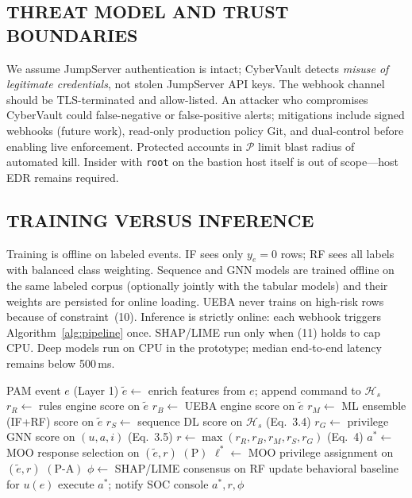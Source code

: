 \documentclass{ieeeaccess}
\begin{document}
\subsection{THREAT MODEL AND TRUST BOUNDARIES}
We assume JumpServer authentication is intact; CyberVault detects \textit{misuse of legitimate credentials}, not stolen JumpServer API keys. The webhook channel should be TLS-terminated and allow-listed. An attacker who compromises CyberVault could false-negative or false-positive alerts; mitigations include signed webhooks (future work), read-only production policy Git, and dual-control before enabling live enforcement. Protected accounts in $\mathcal{P}$ limit blast radius of automated kill. Insider with \texttt{root} on the bastion host itself is out of scope---host EDR remains required.

\subsection{TRAINING VERSUS INFERENCE}
Training is offline on labeled events. IF sees only $y_e=0$ rows; RF sees all labels with balanced class weighting. Sequence and GNN models are trained offline on the same labeled corpus (optionally jointly with the tabular models) and their weights are persisted for online loading. UEBA never trains on high-risk rows because of constraint~(10). Inference is strictly online: each webhook triggers Algorithm~\ref{alg:pipeline} once. SHAP/LIME run only when (11) holds to cap CPU. Deep models run on CPU in the prototype; median end-to-end latency remains below 500\,ms.

\begin{algorithm}[!t]
\caption{Pseudo-Code of the CyberVault Pipeline}
\label{alg:pipeline}
\begin{algorithmic}[1]
\REQUIRE PAM event $e$ (Layer 1)
\STATE $\tilde{e} \leftarrow$ enrich features from $e$; append command to $\mathcal{H}_s$
\STATE $r_R \leftarrow$ rules engine score on $\tilde{e}$
\STATE $r_B \leftarrow$ UEBA engine score on $\tilde{e}$
\STATE $r_M \leftarrow$ ML ensemble (IF+RF) score on $\tilde{e}$
\STATE $r_S \leftarrow$ sequence DL score on $\mathcal{H}_s$ \hfill{(Eq.~3.4)}
\STATE $r_G \leftarrow$ privilege GNN score on $(u,a,i)$ \hfill{(Eq.~3.5)}
\STATE $r \leftarrow \max(r_R,r_B,r_M,r_S,r_G)$ \hfill{(Eq.~4)}
\STATE $a^* \leftarrow$ MOO response selection on $(\tilde{e},r)$ \hfill{$(\mathrm{P})$}
\STATE $\ell^* \leftarrow$ MOO privilege assignment on $(\tilde{e},r)$ \hfill{$(\mathrm{P}\text{-}\mathrm{A})$}
\STATE $\phi \leftarrow$ SHAP/LIME consensus on RF
\ENDIF
{}
\STATE update behavioral baseline for $u(e)$
\ENDIF
\STATE execute $a^*$; notify SOC console
\RETURN $a^*,r,\phi$
\end{algorithmic}
\end{algorithm}
\end{document}
